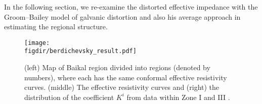 		 In the following section, we re-examine the distorted effective impedance with the Groom--Bailey model of galvanic distortion \citep{groom1989a} and also his average approach in estimating the regional structure.
	
\begin{figure}[!h]
	\centering
	\texttt{[image: \\figdir/berdichevsky\_result.pdf]}
	\caption[Summary of \citet{berdichevsky1980a}]{(left) Map of Baikal region divided into regions (denoted by numbers), where each has the same conformal effective resistivity curves. (middle) The effective resistivity curves and (right) the distribution of the coefficient $K^i$  from data within Zone I and III \citep[after][]{berdichevsky1980a}.}
	\label{fig:berdichevsky_result}
\end{figure}
	
